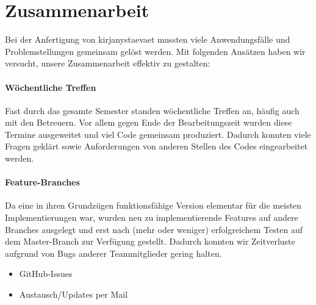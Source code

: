 \section{Zusammenarbeit}

Bei der Anfertigung von kirjanystaevaet mussten viele Anwendungsfälle und Problemstellungen gemeinsam gelöst werden. Mit folgenden Ansätzen haben wir versucht, unsere Zusammenarbeit effektiv zu gestalten:

\paragraph{Wöchentliche Treffen} Fast durch das gesamte Semester standen wöchentliche Treffen an, häufig auch mit den Betreuern. Vor allem gegen Ende der Bearbeitungszeit wurden diese Termine ausgeweitet und viel Code gemeinsam produziert. Dadurch konnten viele Fragen geklärt sowie Anforderungen von anderen Stellen des Codes eingearbeitet werden.

\paragraph{Feature-Branches} Da eine in ihren Grundzügen funktionsfähige Version elementar für die meisten Implementierungen war, wurden neu zu implementierende Features auf andere Branches ausgelegt und erst nach (mehr oder weniger) erfolgreichem Testen auf dem Master-Branch zur Verfügung gestellt. Dadurch konnten wir Zeitverluste aufgrund von Bugs anderer Teammitglieder gering halten. 

	\begin{itemize}
		\item GitHub-Issues
		\item Austausch/Updates per Mail
	\end{itemize}
